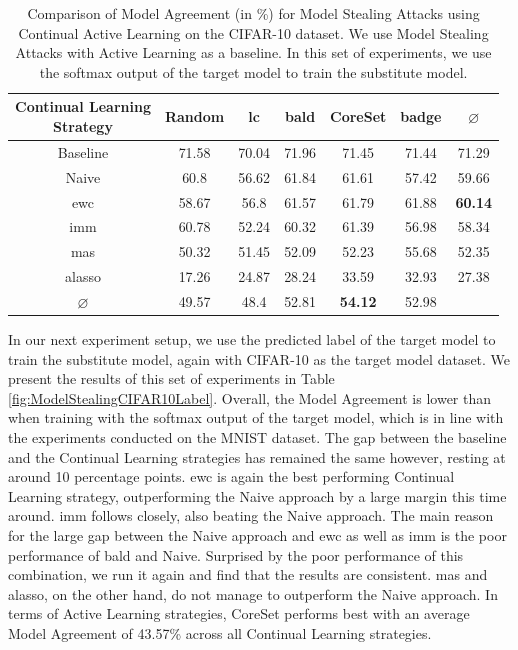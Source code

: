 \begin{table}[h]
    \centering
    \begin{tabular}{c | c c c c c | c} 
        \hline
        \diagbox[width=11em]{Active \\ Learning Strategy}{Continual Learning \\ Strategy} & Random & \gls{lc} & \gls{bald} & CoreSet & \gls{badge} & $\varnothing$\\ 
        \hline 
        Baseline & 71.58 & 70.04 & 71.96 & 71.45 & 71.44 & 71.29\\
        \hline
        Naive & 60.8 & 56.62 & 61.84 & 61.61 & 57.42 & 59.66 \\
        \gls{ewc} & 58.67 & 56.8 & 61.57 & 61.79 & 61.88 & \textbf{60.14}\\
        \gls{imm} & 60.78 & 52.24 & 60.32 & 61.39 & 56.98 & 58.34 \\
        \gls{mas} & 50.32 & 51.45 & 52.09 & 52.23 & 55.68 & 52.35\\
        \gls{alasso} & 17.26 & 24.87 & 28.24 & 33.59 & 32.93 & 27.38\\
        \hline
        $\varnothing$ & 49.57 & 48.4 & 52.81 & \textbf{54.12} & 52.98\\
        \hline
    \end{tabular}
    \caption[Model agreement of Continual Learning strategies on CIFAR-10 using softmax output]{Comparison of Model Agreement (in \%) for Model Stealing Attacks using Continual Active Learning on the CIFAR-10 dataset. We use Model Stealing Attacks with Active Learning as a baseline. In this set of experiments,
    we use the softmax output of the target model to train the substitute model.}
    \label{fig:ModelStealingCIFAR10Softmax}
\end{table}

In our next experiment setup, we use the predicted label of the target model to train the substitute model, again with CIFAR-10 as the target model dataset. We present the results of this set of experiments in Table \ref{fig:ModelStealingCIFAR10Label}. Overall,
the Model Agreement is lower than when training with the softmax output of the target model, which is in line with the experiments conducted on the MNIST dataset. The gap between the baseline and the Continual Learning strategies has remained the same however,
resting at around 10 percentage points. \gls{ewc} is again the best performing Continual Learning strategy, outperforming the Naive approach by a large margin this time around. \gls{imm} follows closely, also beating the Naive approach. The main reason for the large gap
between the Naive approach and \gls{ewc} as well as \gls{imm} is the poor performance of \gls{bald} and Naive. Surprised by the poor performance of this combination, we run it again and find that the results are consistent. \gls{mas} and \gls{alasso}, on the other hand, do not manage to
outperform the Naive approach. In terms of Active Learning strategies, CoreSet performs best with an average Model Agreement of 43.57\% across all Continual Learning strategies. \par

